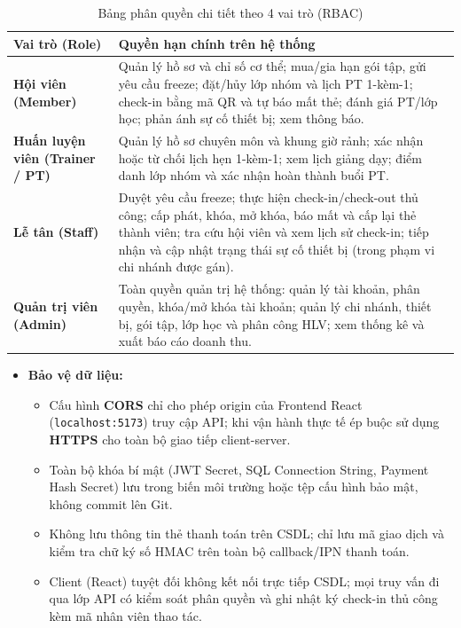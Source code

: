 \documentclass[a4paper,12pt]{article}
\begin{document}
\begin{table}[H]
\centering
\begin{tabularx}{\textwidth}{|L{3.5cm}|Y|}
\hline
\textbf{Vai trò (Role)} & \textbf{Quyền hạn chính trên hệ thống} \\ \hline
\textbf{Hội viên (Member)} & Quản lý hồ sơ và chỉ số cơ thể; mua/gia hạn gói tập, gửi yêu cầu freeze; đặt/hủy lớp nhóm và lịch PT 1-kèm-1; check-in bằng mã QR và tự báo mất thẻ; đánh giá PT/lớp học; phản ánh sự cố thiết bị; xem thông báo. \\ \hline
\textbf{Huấn luyện viên (Trainer / PT)} & Quản lý hồ sơ chuyên môn và khung giờ rảnh; xác nhận hoặc từ chối lịch hẹn 1-kèm-1; xem lịch giảng dạy; điểm danh lớp nhóm và xác nhận hoàn thành buổi PT. \\ \hline
\textbf{Lễ tân (Staff)} & Duyệt yêu cầu freeze; thực hiện check-in/check-out thủ công; cấp phát, khóa, mở khóa, báo mất và cấp lại thẻ thành viên; tra cứu hội viên và xem lịch sử check-in; tiếp nhận và cập nhật trạng thái sự cố thiết bị (trong phạm vi chi nhánh được gán). \\ \hline
\textbf{Quản trị viên (Admin)} & Toàn quyền quản trị hệ thống: quản lý tài khoản, phân quyền, khóa/mở khóa tài khoản; quản lý chi nhánh, thiết bị, gói tập, lớp học và phân công HLV; xem thống kê và xuất báo cáo doanh thu. \\ \hline
\end{tabularx}
\caption{Bảng phân quyền chi tiết theo 4 vai trò (RBAC)}
\end{table}

\begin{itemize}
    \item \textbf{Bảo vệ dữ liệu:}
    \begin{itemize}
        \item Cấu hình \textbf{CORS} chỉ cho phép origin của Frontend React (\texttt{localhost:5173}) truy cập API; khi vận hành thực tế ép buộc sử dụng \textbf{HTTPS} cho toàn bộ giao tiếp client-server.
        \item Toàn bộ khóa bí mật (JWT Secret, SQL Connection String, Payment Hash Secret) lưu trong biến môi trường hoặc tệp cấu hình bảo mật, không commit lên Git.
        \item Không lưu thông tin thẻ thanh toán trên CSDL; chỉ lưu mã giao dịch và kiểm tra chữ ký số HMAC trên toàn bộ callback/IPN thanh toán.
        \item Client (React) tuyệt đối không kết nối trực tiếp CSDL; mọi truy vấn đi qua lớp API có kiểm soát phân quyền và ghi nhật ký check-in thủ công kèm mã nhân viên thao tác.
    \end{itemize}
\end{itemize}
\end{document}
